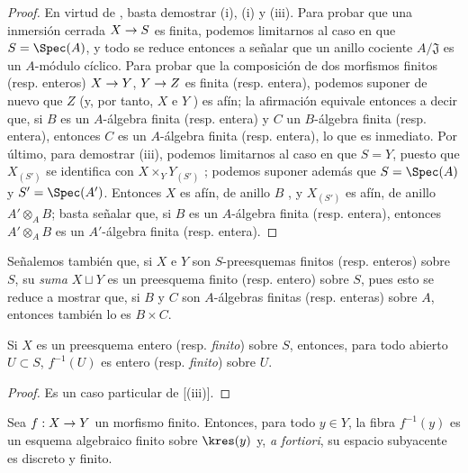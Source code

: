\documentclass[oneside,10pt]{amsart}
\makeatletter
\newcommand{\ega@arrow}[2]{\mathchoice{#1}{#2}{#2}{#2}}
\renewcommand{\to}{\ega@arrow{\longrightarrow}{\rightarrow}}
\newcommand{\oldpage}[2][]{\marginnote{\normalfont\footnotesize\textbf{#1}~|~#2}\ignorespaces}
\let\EGAOriginalLabel\label
\renewcommand{\label}[1]{\phantomsection\EGAOriginalLabel{#1}}
\makeatother
\begin{document}
\oldpage[II]{112}
\begin{proof}
En virtud de , basta demostrar (i), (i) y (iii).
Para probar que una inmersión cerrada $X\to S$ es finita, podemos limitarnos al caso en que $S=\Spec(A)$, y todo se reduce entonces a señalar que un anillo cociente $A/\mathfrak{J}$ es un $A$-módulo cíclico.
Para probar que la composición de dos morfismos finitos (resp. enteros) $X\to Y$, $Y\to Z$ es finita (resp. entera), podemos suponer de nuevo que $Z$ (y, por tanto, $X$ e $Y$ ) es afín; la afirmación equivale entonces a decir que, si $B$ es un $A$-álgebra finita (resp. entera) y $C$ un $B$-álgebra finita (resp. entera), entonces $C$ es un $A$-álgebra finita (resp. entera), lo que es inmediato.
Por último, para demostrar (iii), podemos limitarnos al caso en que $S=Y$, puesto que $X_{(S')}$ se identifica con $X\times_Y Y_{(S')}$ ;
podemos suponer además que $S=\Spec(A)$ y $S'=\Spec(A')$.
Entonces $X$ es afín, de anillo $B$ , y $X_{(S')}$ es afín, de anillo $A'\otimes_A B$; basta señalar que, si $B$ es un $A$-álgebra finita (resp. entera), entonces $A'\otimes_A B$ es un $A'$-álgebra finita (resp. entera).
\end{proof}

Señalemos también que, si $X$ e $Y$ son $S$-preesquemas finitos (resp. enteros) sobre $S$, su \emph{suma} $X\sqcup Y$ es un preesquema finito (resp. entero) sobre $S$, pues esto se reduce a mostrar que, si $B$ y $C$ son $A$-álgebras finitas (resp. enteras) sobre $A$, entonces también lo es $B\times C$.

\begin{corollary}[6.1.6]
\label{II.6.1.6}
Si $X$ es un preesquema entero \textup{(resp. \emph{finito})} sobre $S$, entonces, para todo abierto $U\subset S$, $f^{-1}(U)$ es entero \textup{(resp. \emph{finito})} sobre $U$.
\end{corollary}

\begin{proof}
Es un caso particular de [(iii)].
\end{proof}

\begin{corollary}[6.1.7]
\label{II.6.1.7}
Sea $f:X\to Y$ un morfismo finito.
Entonces, para todo $y\in Y$, la fibra $f^{-1}(y)$ es un esquema algebraico finito sobre $\kres(y)$ y, \emph{a fortiori}, su espacio subyacente es discreto y finito.
\end{corollary}
\end{document}
